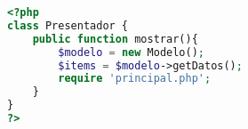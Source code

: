 \begin{lstlisting}[label=mvp_presentador,caption=Clase Presentador,language=PHP]
<?php
class Presentador {
	public function mostrar(){
		$modelo = new Modelo();
		$items = $modelo->getDatos();
		require 'principal.php';
	}
}
?>
\end{lstlisting}
